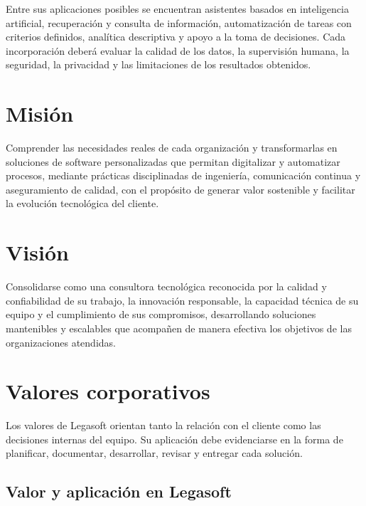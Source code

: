 Entre sus aplicaciones posibles se encuentran asistentes basados en inteligencia
artificial, recuperación y consulta de información, automatización de tareas con
criterios definidos, analítica descriptiva y apoyo a la toma de decisiones. Cada
incorporación deberá evaluar la calidad de los datos, la supervisión humana, la
seguridad, la privacidad y las limitaciones de los resultados obtenidos.

\section{Misión}

\begin{nota}[Misión]
Comprender las necesidades reales de cada organización y transformarlas en
soluciones de software personalizadas que permitan digitalizar y automatizar
procesos, mediante prácticas disciplinadas de ingeniería, comunicación continua y
aseguramiento de calidad, con el propósito de generar valor sostenible y
facilitar la evolución tecnológica del cliente.
\end{nota}

\section{Visión}

\begin{nota}[Visión]
Consolidarse como una consultora tecnológica reconocida por la calidad y
confiabilidad de su trabajo, la innovación responsable, la capacidad técnica de
su equipo y el cumplimiento de sus compromisos, desarrollando soluciones
mantenibles y escalables que acompañen de manera efectiva los objetivos de las
organizaciones atendidas.
\end{nota}

\section{Valores corporativos}

Los valores de Legasoft orientan tanto la relación con el cliente como las
decisiones internas del equipo. Su aplicación debe evidenciarse en la forma de
planificar, documentar, desarrollar, revisar y entregar cada solución.

\subsection{Valor y aplicación en Legasoft}

